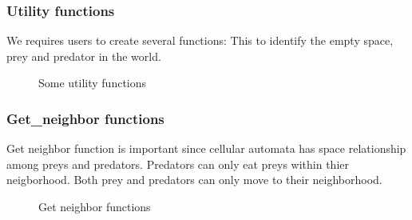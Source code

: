 \documentclass{article}
\begin{document}
\begin{normalsize}
\subsubsection{Utility functions}
We requires users to create several functions: This to identify the empty space, prey and predator in the world.
\begin{figure}[H]
	\caption{Some utility functions}
\end{figure}
\subsubsection{Get\_neighbor functions}
Get neighbor function is important since cellular automata has space relationship among preys and predators. Predators can only eat preys within thier neigborhood. Both prey and predators can only move to their neighborhood.
\begin{figure}[H]
	\caption{Get neighbor functions}
\end{figure}


\end{normalsize}
\end{document}
